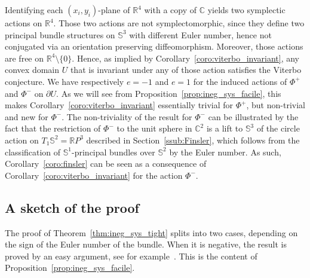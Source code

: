 \documentclass[AHL,Unicode,longabstracts]{cedram}
\newcommand{\bbS}{\mathbb{S}}
\newcommand{\bbR}{\mathbb{R}}
\newcommand{\bbC}{\mathbb{C}}
\newcommand{\bbS}{\mathbb{S}}
\begin{document}
Identifying each $(x_i,y_i)$-plane of $\bbR^4$ with a copy of $\bbC$ yields two symplectic actions on $\bbR^4$. Those two actions are not symplectomorphic, since they define two principal bundle structures on $\bbS^3$ with different Euler number, hence not conjugated via an orientation preserving diffeomorphism. Moreover, those actions are free on $\bbR^4 \setminus \{0\}$. Hence, as implied by Corollary~\ref{coro:viterbo_invariant}, any convex domain $U$ that is invariant under any of those action satisfies the Viterbo conjecture. We have respectively $e=-1$ and $e=1$ for the induced actions of $\Phi^+$ and $\Phi^-$ on $\partial U$. As we will see from Proposition~\ref{prop:ineg_sys_facile}, this makes Corollary~\ref{coro:viterbo_invariant} essentially trivial for $\Phi^+$, but non-trivial and new for $\Phi^-$. The non-triviality of the result for $\Phi^-$ can be illustrated by the fact that the restriction of $\Phi^-$ to the unit sphere in $\bbC^2$ is a lift to $\bbS^3$ of the circle action on $T_1 \bbS^2 = \bbR P^3$ described in Section~\ref{ssub:Finsler}, which follows from the classification of $\bbS^1$-principal bundles over $\bbS^2$ by the Euler number. As such, Corollary~\ref{coro:finsler} can be seen as a consequence of Corollary~\ref{coro:viterbo_invariant} for the action $\Phi^-$.


\subsection{A sketch of the proof}

The proof of Theorem~\ref{thm:ineg_sys_tight} splits into two cases, depending on the sign of the Euler number of the bundle. When it is negative, the result is proved by an easy argument, see for example~\cite{hutchings_2013}. This is the content of Proposition~\ref{prop:ineg_sys_facile}.
\end{document}
